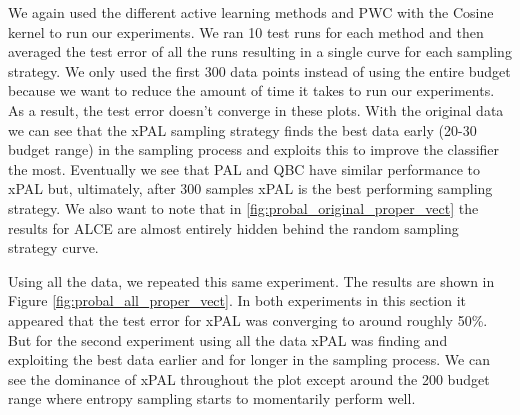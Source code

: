 We again used the different active learning methods and PWC with the Cosine kernel to run our experiments. We ran 10 test runs for each method and then averaged the test error of all the runs resulting in a single curve for each sampling strategy. We only used the first 300 data points instead of using the entire budget because we want to reduce the amount of time it takes to run our experiments. As a result, the test error doesn't converge in these plots. With the original data we can see that the xPAL sampling strategy finds the best data early (20-30 budget range) in the sampling process and exploits this to improve the classifier the most. Eventually we see that PAL and QBC have similar performance to xPAL but, ultimately, after 300 samples xPAL is the best performing sampling strategy. We also want to note that in \ref{fig:probal_original_proper_vect} the results for ALCE are almost entirely hidden behind the random sampling strategy curve. 

Using all the data, we repeated this same experiment. The results are shown in Figure \ref{fig:probal_all_proper_vect}. In both experiments in this section it appeared that the test error for xPAL was converging to around roughly 50\%. But for the second experiment using all the data xPAL was finding and exploiting the best data earlier and for longer in the sampling process. We can see the dominance of xPAL throughout the plot except around the 200 budget range where entropy sampling starts to momentarily perform well.

